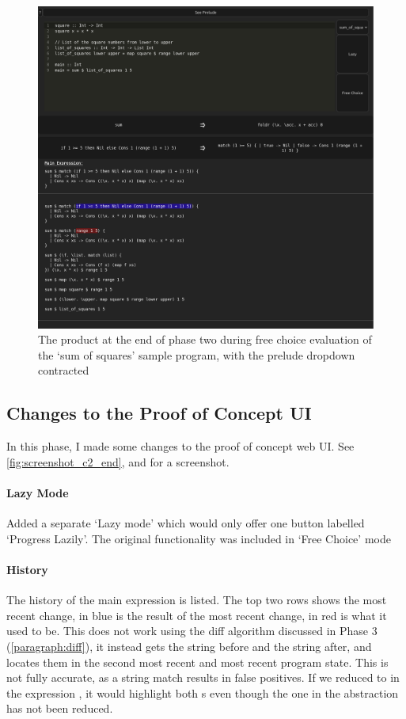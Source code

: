 \begin{figure}[h]
    \centering
    \includegraphics[width=1\linewidth]{images/phase-2-end3.png} 
    \captionsetup{justification=centering}
    \caption{The product at the end of phase two during free choice evaluation of the `sum of squares' sample program, with the prelude dropdown contracted}
    \label{fig:screenshot_c2_end_free}
\end{figure}

\subsection{Changes to the Proof of Concept UI}
\label{c2_poc_ui_impl}
In this phase, I made some changes to the proof of concept web UI. See \ref{fig:screenshot_c2_end}, and for a screenshot. 

\paragraph{Lazy Mode}
Added a separate `Lazy mode' which would only offer one button labelled `Progress Lazily'. The original functionality was included in `Free Choice' mode

\paragraph{History}
The history of the main expression is listed. The top two rows shows the most recent change, in blue is the result of the most recent change, in red is what it used to be. This does not work using the diff algorithm discussed in Phase 3 (\ref{paragraph:diff}), it instead gets the string before and the string after, and locates them in the second most recent and most recent program state. This is not fully accurate, as a string match results in false positives. If we reduced  to  in the expression , it would highlight both s even though the one in the abstraction has not been reduced. 

